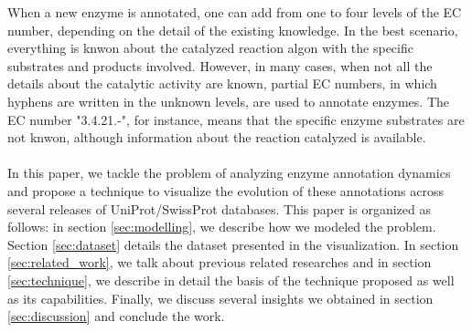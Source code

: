 
When a new enzyme is annotated, one can add from one to four levels of the EC number, depending on the detail of the existing knowledge. In the best scenario, everything is knwon about the catalyzed reaction algon with the specific substrates and products involved. However, in many cases, when not all the details about the catalytic activity are known, partial EC numbers, in which hyphens are written in the unknown levels, are used to annotate enzymes. The EC number "3.4.21.-", for instance, means that the specific enzyme substrates are not knwon, although information about the reaction catalyzed is available.
\\
\\
In this paper, we tackle the problem of analyzing enzyme annotation dynamics and propose a technique to visualize the evolution of these annotations across several releases of UniProt/SwissProt databases. This paper is organized as follows: in section \ref{sec:modelling}, we describe how we modeled the problem. Section \ref{sec:dataset} details the dataset presented in the visualization. In section \ref{sec:related_work}, we talk about previous related researches and in section \ref{sec:technique}, we describe in detail the basis of the technique proposed as well as its capabilities. Finally, we discuss several insights we obtained in section \ref{sec:discussion} and conclude the work.
